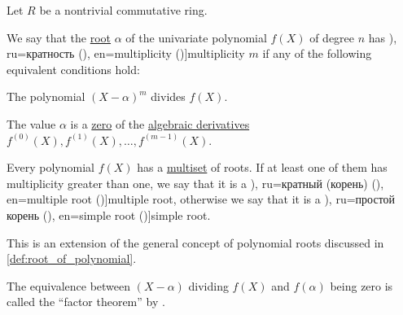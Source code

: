 \begin{definition}\label{def:multiple_root}\mimprovised
  Let \( R \) be a nontrivial commutative ring.

  We say that the \hyperref[def:root_of_polynomial]{root} \( \alpha \) of the univariate polynomial \( f(X) \) of degree \( n \) has \term[bg=кратност (\cite[171]{Обрешков1962ВисшаАлгебра}), ru=кратность (\cite[163]{Тыртышников2017ОсновыАлгебры}), en=multiplicity (\cite[229]{Jacobson1985BasicAlgebraI})]{multiplicity} \( m \) if any of the following equivalent conditions hold:
  \begin{thmenum}
     The polynomial \( (X - \alpha)^m \) divides \( f(X) \).

     The value \( \alpha \) is a \hyperref[def:root_of_polynomial]{zero} of the \hyperref[def:algebraic_derivative]{algebraic derivatives} \( f^{(0)}(X), f^{(1)}(X), \ldots, f^{(m-1)}(X) \).
  \end{thmenum}

  Every polynomial \( f(X) \) has a \hyperref[def:multiset]{multiset} of roots. If at least one of them has multiplicity greater than one, we say that it is a \term[bg=многократен (корен) (\cite[171]{Обрешков1962ВисшаАлгебра}), ru=кратный (корень) (\cite[163]{Тыртышников2017ОсновыАлгебры}), en=multiple root (\cite[229]{Jacobson1985BasicAlgebraI})]{multiple root}, otherwise we say that it is a \term[bg=прост корен (\cite[171]{Обрешков1962ВисшаАлгебра}), ru=простой корень (\cite[163]{Тыртышников2017ОсновыАлгебры}), en=simple root (\cite[229]{Jacobson1985BasicAlgebraI})]{simple root}.
\end{definition}
\begin{comments}
  \item This is an extension of the general concept of polynomial roots discussed in \cref{def:root_of_polynomial}.

  \item The equivalence between \( (X - \alpha) \) dividing \( f(X) \) and \( f(\alpha) \) being zero is called the \enquote{factor theorem} by .
\end{comments}
